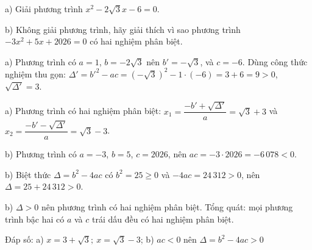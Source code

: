 \begin{problem}[9DS-PT2-022]
a) Giải phương trình $x^2 - 2\sqrt{3}x - 6 = 0$.

b) Không giải phương trình, hãy giải thích vì sao phương trình $-3x^2 + 5x + 2026 = 0$ có hai nghiệm phân biệt.

\begin{solution}
a) Phương trình có $a = 1$, $b = -2\sqrt{3}$ nên $b' = -\sqrt{3}$, và $c = -6$. Dùng công thức nghiệm thu gọn: $\Delta' = b'^2 - ac = (-\sqrt{3})^2 - 1 \cdot (-6) = 3 + 6 = 9 > 0$, $\sqrt{\Delta'} = 3$.

a) Phương trình có hai nghiệm phân biệt: $x_1 = \dfrac{-b' + \sqrt{\Delta'}}{a} = \sqrt{3} + 3$ và $x_2 = \dfrac{-b' - \sqrt{\Delta'}}{a} = \sqrt{3} - 3$.

b) Phương trình có $a = -3$, $b = 5$, $c = 2026$, nên $ac = -3 \cdot 2026 = -6\,078 < 0$.

b) Biệt thức $\Delta = b^2 - 4ac$ có $b^2 = 25 \geq 0$ và $-4ac = 24\,312 > 0$, nên $\Delta = 25 + 24\,312 > 0$.

b) $\Delta > 0$ nên phương trình có hai nghiệm phân biệt. Tổng quát: mọi phương trình bậc hai có $a$ và $c$ trái dấu đều có hai nghiệm phân biệt.

Đáp số: a) $\boxed{x = 3 + \sqrt{3};\ x = \sqrt{3} - 3}$; b) $\boxed{ac < 0 \text{ nên } \Delta = b^2 - 4ac > 0}$
\end{solution}
\end{problem}

